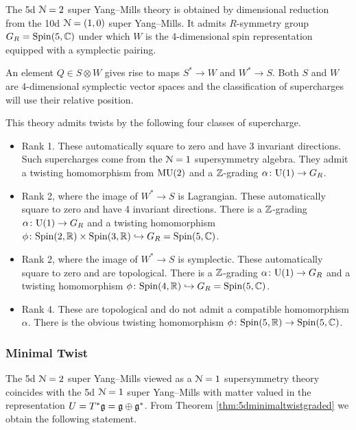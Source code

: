 \documentclass[10pt, oneside]{article}
\begin{document}
The 5d $\mathcal N=2$ super Yang--Mills theory is obtained by dimensional reduction from the 10d $\mathcal N=(1, 0)$ super Yang--Mills. It admits $R$-symmetry group $G_R=\mathrm{Spin}(5, \mathbb C)$ under which $W$ is the 4-dimensional spin representation equipped with a symplectic pairing.

An element $Q\in S\otimes W$ gives rise to maps $S^*\rightarrow W$ and $W^*\rightarrow S$. Both $S$ and $W$ are 4-dimensional symplectic vector spaces and the classification of supercharges will use their relative position.

This theory admits twists by the following four classes of supercharge.
\begin{itemize}
\item Rank 1. These automatically square to zero and have 3 invariant directions. Such supercharges come from the $\mathcal N=1$ supersymmetry algebra. They admit a twisting homomorphism from $\mathrm{MU}(2)$ and a $\mathbb Z$-grading $\alpha\colon \mathrm{U}(1)\rightarrow G_R$.

\item Rank 2, where the image of $W^*\rightarrow S$ is Lagrangian. These automatically square to zero and have 4 invariant directions. There is a $\mathbb Z$-grading $\alpha\colon \mathrm{U}(1)\rightarrow G_R$ and a twisting homomorphism $\phi\colon \mathrm{Spin}(2, \mathbb R)\times \mathrm{Spin}(3, \mathbb R)\hookrightarrow G_R=\mathrm{Spin}(5, \mathbb C)$.

\item Rank 2, where the image of $W^*\rightarrow S$ is symplectic. These automatically square to zero and are topological. There is a $\mathbb Z$-grading $\alpha\colon \mathrm{U}(1)\rightarrow G_R$ and a twisting homomorphism $\phi\colon \mathrm{Spin}(4, \mathbb R)\hookrightarrow G_R=\mathrm{Spin}(5, \mathbb C)$.

\item Rank 4. These are topological and do not admit a compatible homomorphism $\alpha$. There is the obvious twisting homomorphism $\phi\colon \mathrm{Spin}(5, \mathbb R)\rightarrow \mathrm{Spin}(5, \mathbb C)$.
\end{itemize}

\subsubsection{Minimal Twist}
\label{sect:5dminimaltwist}

The 5d $\mathcal N=2$ super Yang--Mills viewed as a $\mathcal N=1$ supersymmetry theory coincides with the 5d $\mathcal N=1$ super Yang--Mills with matter valued in the representation $U=T^*\mathfrak g=\mathfrak g\oplus \mathfrak g^*$. From Theorem \ref{thm:5dminimaltwistgraded} we obtain the following statement.
\end{document}
